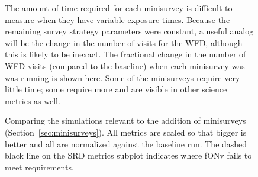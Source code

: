 \begin{figure}
\caption{The amount of time required for each minisurvey is difficult to measure when they have variable exposure times. Because the remaining survey strategy parameters were constant, a useful analog will be the change in the number of visits for the WFD, although this is likely to be inexact. The fractional change in the number of WFD visits (compared to the baseline) when each minisurvey was was running is shown here. Some of the minisurveys require very little time; some require more and are visible in other science metrics as well.}
\label{fig:minisurvey_time}
\end{figure}

\begin{figure}
\caption{Comparing the simulations relevant to the addition of minisurveys (Section~\ref{sec:minisurveys}). All metrics are scaled so that bigger is better and all are normalized against the baseline run. The dashed black line on the SRD metrics subplot indicates where fONv fails to meet requirements.}
\label{fig:minisurveys}
\end{figure}


